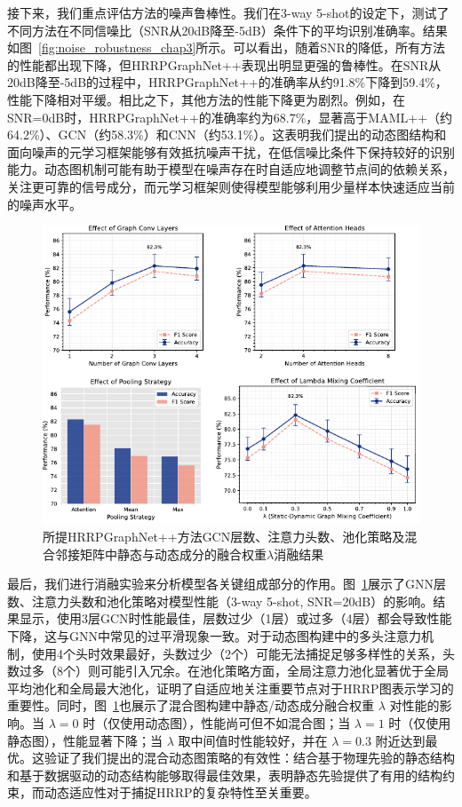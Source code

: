 接下来，我们重点评估方法的噪声鲁棒性。我们在3-way 5-shot的设定下，测试了不同方法在不同信噪比（SNR从20dB降至-5dB）条件下的平均识别准确率。结果如图~\ref{fig:noise_robustness_chap3}所示。可以看出，随着SNR的降低，所有方法的性能都出现下降，但HRRPGraphNet++表现出明显更强的鲁棒性。在SNR从20dB降至-5dB的过程中，HRRPGraphNet++的准确率从约91.8\%下降到59.4\%，性能下降相对平缓。相比之下，其他方法的性能下降更为剧烈。例如，在SNR=0dB时，HRRPGraphNet++的准确率约为68.7\%，显著高于MAML++（约64.2\%）、GCN（约58.3\%）和CNN（约53.1\%）。这表明我们提出的动态图结构和面向噪声的元学习框架能够有效抵抗噪声干扰，在低信噪比条件下保持较好的识别能力。动态图机制可能有助于模型在噪声存在时自适应地调整节点间的依赖关系，关注更可靠的信号成分，而元学习框架则使得模型能够利用少量样本快速适应当前的噪声水平。

\begin{figure}[h]
    \centering
    \includegraphics[width=0.8\linewidth]{figures/abla.pdf} %
    \caption{所提HRRPGraphNet++方法GCN层数、注意力头数、池化策略及混合邻接矩阵中静态与动态成分的融合权重$\lambda$消融结果}
    \label{fig:abla}
\end{figure}

最后，我们进行消融实验来分析模型各关键组成部分的作用。图~\ref{fig:abla}展示了GNN层数、注意力头数和池化策略对模型性能（3-way 5-shot, SNR=20dB）的影响。结果显示，使用3层GCN时性能最佳，层数过少（1层）或过多（4层）都会导致性能下降，这与GNN中常见的过平滑现象一致。对于动态图构建中的多头注意力机制，使用4个头时效果最好，头数过少（2个）可能无法捕捉足够多样性的关系，头数过多（8个）则可能引入冗余。在池化策略方面，全局注意力池化显著优于全局平均池化和全局最大池化，证明了自适应地关注重要节点对于HRRP图表示学习的重要性。同时，图~\ref{fig:abla}也展示了混合图构建中静态/动态成分融合权重 $\lambda$ 对性能的影响。当 $\lambda=0$ 时（仅使用动态图），性能尚可但不如混合图；当 $\lambda=1$ 时（仅使用静态图），性能显著下降；当 $\lambda$ 取中间值时性能较好，并在 $\lambda=0.3$ 附近达到最优。这验证了我们提出的混合动态图策略的有效性：结合基于物理先验的静态结构和基于数据驱动的动态结构能够取得最佳效果，表明静态先验提供了有用的结构约束，而动态适应性对于捕捉HRRP的复杂特性至关重要。

